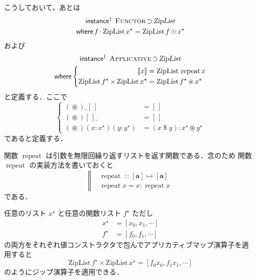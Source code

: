 \documentclass[a5paper,twoside,fleqn,draft]{jsbook}
\def\[{[\![}
\def\]{]\!]}
\newcommand{\mBrace}{\Vert}
\newcommand{\mKeyword}[1]{\mathsf{#1}}
\newcommand{\mInstanceDeclKeyword}{\mKeyword{instance}}
\newcommand{\mWhereKeyword}{\mKeyword{where}}
\DeclareMathOperator{\mInstanceDeclPolymorphic}{\mInstanceDeclKeyword^{\dagger}}
\DeclareMathOperator{\mSuperSet}{\supset}
\DeclareMathOperator{\mWhere}{\mWhereKeyword}
\newcommand{\mEmptyList}{{[\,]}}
\newcommand{\mSpecialFunc}[1]{#1}
\DeclareMathOperator{\mRepeat}{\mSpecialFunc{repeat}}
\DeclareMathOperator{\mApply}{\$}
\DeclareMathOperator{\mAppMap}{\times}
\DeclareMathOperator{\mIn}{{:\!:}}
\DeclareMathOperator{\mMap}{\cdot}
\DeclareMathOperator{\mMapList}{\odot}
\DeclareMathOperator{\mMapsTo}{\mapsto}
\DeclareMathOperator{\mZip}{\circledast}
\newcommand{\mType}[1]{\mathbf{#1}} %
\newcommand{\mA}{\mType{a}}
\newcommand{\mTypeConstructor}[1]{\textsl{#1}}
\DeclareMathOperator{\mZipListTypeConstructor}{\mTypeConstructor{ZipList}}
\newcommand{\mValueConstructor}[1]{\mathrm{#1}}
\newcommand{\mValueWith}[2]{\mValueConstructor{#1}\,#2}
\newcommand{\mZipListWith}[1]{\mValueWith{ZipList}{#1}}
\newcommand{\mPureWith}[1]{\[#1\]}
\newcommand{\mTypeClass}[1]{\textsc{#1}} %
\newcommand{\mApplicativeTypeClass}{\mTypeClass{Applicative}}
\newcommand{\mFunctorTypeClass}{\mTypeClass{Functor}}
\newcommand{\mList}[1]{{#1}^\mathrm{\star}}
\newcommand{\mProjEXP}[2]{#1\mMapsTo#2} %
\begin{document}
こうしておいて，あとは
\begin{multline}
  \mInstanceDeclPolymorphic\;
  \mFunctorTypeClass\mSuperSet\mZipListTypeConstructor\\
  \mWhere
  f\mMap{}\mZipListWith{\mList{x}}=\mZipListWith{f\mMapList\mList{x}}
\end{multline}
および
\begin{multline}
  \mInstanceDeclPolymorphic\;
  \mApplicativeTypeClass\mSuperSet\mZipListTypeConstructor\\
  \mWhere
  \left\{
  \begin{aligned}
    \mPureWith{x}
    &=\mZipListWith{\mRepeat x}\\
    \mZipListWith{\mList{f}}\mAppMap\mZipListWith{\mList{x}}
    &=\mZipListWith{\mList{f}\mZip\mList{x}}
  \end{aligned}
  \right.
\end{multline}
と定義する．ここで
\begin{equation}
  \label{eq:zip}
  \left\{
  \begin{aligned}
    (\mZip)\_\mEmptyList&=\mEmptyList\\
    (\mZip)\mEmptyList\_&=\mEmptyList\\
    (\mZip)(x:\mList{x})(y:\mList{y})&=(x\mApply y):\mList{x}\mZip\mList{y}
  \end{aligned}
  \right.
\end{equation}
であると定義する．

関数 $\mRepeat$ は引数を無限回繰り返すリストを返す関数である．念のため
関数 $\mRepeat$ の実装方法を書いておくと
\begin{equation}
  \left\mBrace
  \begin{aligned}
    &\mRepeat\mIn{}\mProjEXP{[\mA]}{[\mA]}\\
    &\mRepeat x=x:\mRepeat x
  \end{aligned}
  \right.
\end{equation}
である．

任意のリスト $\mList{x}$ と任意の関数リスト $\mList{f}$ ただし
\begin{align}
\mList{x}&=[x_0,x_1,\dotsb]\\
\mList{f}&=[f_0,f_1,\dotsb]
\end{align}
の両方をそれぞれ値コンストラクタで包んでアプリカティブマップ演算子を適
用すると
\begin{equation}
  \mZipListWith{\mList{f}}\mAppMap\mZipListWith{\mList{x}}
  =[f_0x_0,f_1x_1,\dotsb]
\end{equation}
のようにジップ演算子を適用できる．
\end{document}
